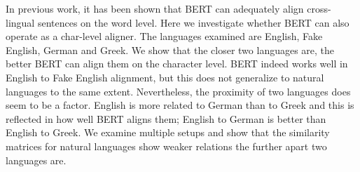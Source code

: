 In previous work, it has been shown that BERT can adequately align cross-lingual sentences on the word level. Here we investigate whether BERT can also operate as a char-level aligner. The languages examined are English, Fake English, German and Greek. We show that the closer two languages are, the better BERT can align them on the character level. BERT indeed works well in English to Fake English alignment, but this does not generalize to natural languages to the same extent. Nevertheless, the proximity of two languages does seem to be a factor. English is more related to German than to Greek and this is reflected in how well BERT aligns them; English to German is better than English to Greek. We examine multiple setups and show that the similarity matrices for natural languages show weaker relations the further apart two languages are.
